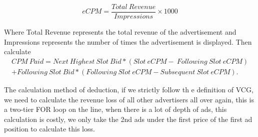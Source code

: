\[ eCPM = \frac{Total\ Revenue}{Impressions} \times 1000 \]

Where Total Revenue represents the total revenue of the advertisement and Impressions represents the number of times the advertisement is displayed. Then calculate
\begin{equation} 
\begin{split}
    CPM \ Paid = Next \ Highest \ Slot \ Bid *(Slot \ eCPM - \ Following \ Slot \ eCPM) \\ 
+ Following \ Slot \ Bid *(Following \ Slot \ eCPM - Subsequent \ Slot \ eCPM).
\end{split}
\end{equation}

The calculation method of deduction, if we strictly follow th e definition of VCG, we need to calculate the revenue loss of all other advertisers all over again, this is a two-tier FOR loop on the line, when there is a lot of depth of ads, this calculation is costly, we only take the 2nd ads under the first price of the first ad position to calculate this loss.







